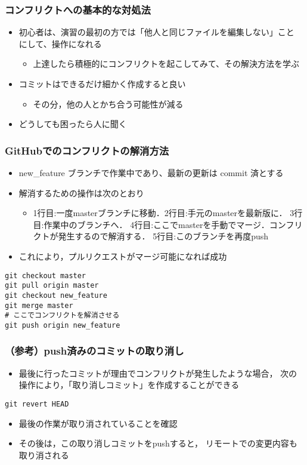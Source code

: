 \documentclass[a4paper,twoside,twocolumn]{bxjsarticle}
\begin{document}
\subsubsection{コンフリクトへの基本的な対処法}
\label{sec-2-4-2}
\begin{itemize}
\item 初心者は、演習の最初の方では「他人と同じファイルを編集しない」こと
にして、操作になれる
\begin{itemize}
\item 上達したら積極的にコンフリクトを起こしてみて、その解決方法を学ぶ
\end{itemize}
\item コミットはできるだけ細かく作成すると良い
\begin{itemize}
\item その分，他の人とかち合う可能性が減る
\end{itemize}
\item どうしても困ったら人に聞く
\end{itemize}
\subsubsection{GitHubでのコンフリクトの解消方法}
\label{sec-2-4-3}
\begin{itemize}
\item new\_feature ブランチで作業中であり、最新の更新は commit 済とする

\item 解消するための操作は次のとおり
\begin{itemize}
\item 1行目:一度masterブランチに移動．2行目:手元のmasterを最新版に．
3行目:作業中のブランチへ．
4行目:ここでmasterを手動でマージ．コンフリクトが発生するので解消する．
5行目:このブランチを再度push
\end{itemize}
\item これにより，プルリクエストがマージ可能になれば成功
\end{itemize}

\begin{verbatim}
git checkout master
git pull origin master
git checkout new_feature
git merge master
# ここでコンフリクトを解消させる
git push origin new_feature
\end{verbatim}

\subsubsection{（参考）push済みのコミットの取り消し}
\label{sec-2-4-4}
\begin{itemize}
\item 最後に行ったコミットが理由でコンフリクトが発生したような場合，
次の操作により，「取り消しコミット」を作成することができる
\end{itemize}

\begin{verbatim}
git revert HEAD
\end{verbatim}

\begin{itemize}
\item 最後の作業が取り消されていることを確認
\item その後は，この取り消しコミットをpushすると，
リモートでの変更内容も取り消される
\end{itemize}
\end{document}
